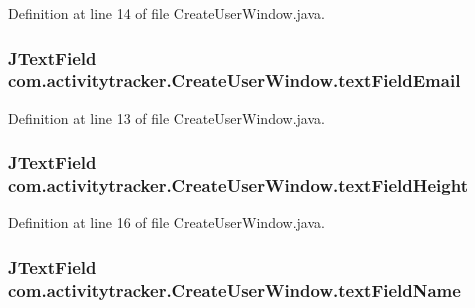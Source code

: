 Definition at line 14 of file Create\+User\+Window.\+java.

\subsubsection[{\texorpdfstring{text\+Field\+Email}{textFieldEmail}}]{\setlength{\rightskip}{0pt plus 5cm}J\+Text\+Field com.\+activitytracker.\+Create\+User\+Window.\+text\+Field\+Email\hspace{0.3cm}{\ttfamily [private]}}\hypertarget{classcom_1_1activitytracker_1_1_create_user_window_a4f6010631cb7be5a2ae3691bdca31483}{}\label{classcom_1_1activitytracker_1_1_create_user_window_a4f6010631cb7be5a2ae3691bdca31483}


Definition at line 13 of file Create\+User\+Window.\+java.

\subsubsection[{\texorpdfstring{text\+Field\+Height}{textFieldHeight}}]{\setlength{\rightskip}{0pt plus 5cm}J\+Text\+Field com.\+activitytracker.\+Create\+User\+Window.\+text\+Field\+Height\hspace{0.3cm}{\ttfamily [private]}}\hypertarget{classcom_1_1activitytracker_1_1_create_user_window_ac5ce2bc2efbc06d578d93fb3f26aad1c}{}\label{classcom_1_1activitytracker_1_1_create_user_window_ac5ce2bc2efbc06d578d93fb3f26aad1c}


Definition at line 16 of file Create\+User\+Window.\+java.

\subsubsection[{\texorpdfstring{text\+Field\+Name}{textFieldName}}]{\setlength{\rightskip}{0pt plus 5cm}J\+Text\+Field com.\+activitytracker.\+Create\+User\+Window.\+text\+Field\+Name\hspace{0.3cm}{\ttfamily [private]}}\hypertarget{classcom_1_1activitytracker_1_1_create_user_window_aa2b8cf1781a8a1534dbf5c5b98332c05}{}\label{classcom_1_1activitytracker_1_1_create_user_window_aa2b8cf1781a8a1534dbf5c5b98332c05}


